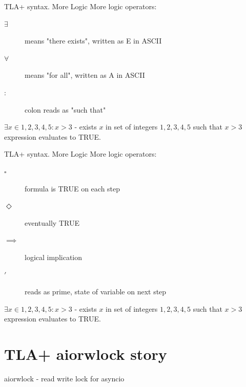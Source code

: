 \documentclass[12pt]{beamer}
\begin{document}
  \begin{frame}{TLA+ syntax. More Logic}
      More logic operators:
      \begin{description}
        \item[$\exists$] means "there exists", written as E in ASCII
        \item[$\forall$]  means "for all", written as A in ASCII
        \item[$:$] colon reads as "such that"
      \end{description}
      $\exists x \in {1,2,3,4,5} : x > 3$ - exists $x$ in
      set of integers ${1,2,3,4,5}$ such that $x > 3$ expression evaluates
      to TRUE.
  \end{frame}
  \begin{frame}{TLA+ syntax. More Logic}
      More logic operators:
      \begin{description}
        \item[$\square$] formula is TRUE on each step
        \item[$\Diamond$] eventually TRUE
        \item[$\implies$] logical implication
        \item[$'$] reads as prime, state of variable on next step

      \end{description}
      $\exists x \in {1,2,3,4,5} : x > 3$ - exists $x$ in
      set of integers ${1,2,3,4,5}$ such that $x > 3$ expression evaluates
      to TRUE.
  \end{frame}
  \section{TLA+ aiorwlock story}
  \begin{frame}{aiorwlock - read write lock for asyncio}
  \end{frame}
\end{document}
